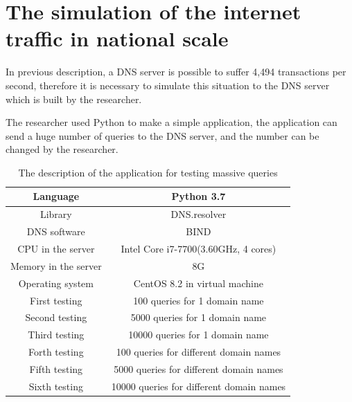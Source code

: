 \section{The simulation of the internet traffic in national scale}

In previous description,  a DNS server is possible to suffer 4,494 transactions per second, therefore it is necessary to simulate this situation to the DNS server which is built by the researcher.

The researcher used Python to make a simple application, the application can send a huge number of queries to the DNS server, and the number can be changed by the researcher.

\begin{table}[hbt!]
    \centering
    \begin{tabular}{|c|c|}
        \hline
         Language & Python 3.7 \\    
        \hline
         Library &  DNS.resolver \\
        \hline
         DNS software & BIND \\
        \hline
         CPU in the server & Intel Core i7-7700(3.60GHz, 4 cores)\\
        \hline
         Memory in the server & 8G \\
        \hline
         Operating system & CentOS 8.2 in virtual machine \\
        \hline
         First testing & 100 queries for 1 domain name \\
        \hline
         Second testing & 5000 queries for 1 domain name \\
        \hline
         Third testing & 10000 queries for 1 domain name \\
        \hline
         Forth testing & 100 queries for different domain names \\ 
        \hline
         Fifth testing & 5000 queries for different domain names \\ 
        \hline
         Sixth testing & 10000 queries for different domain names \\ 
        \hline
    \end{tabular}
    \caption{The description of the application for testing massive queries}
    \label{tab:Queries_application}
\end{table}
